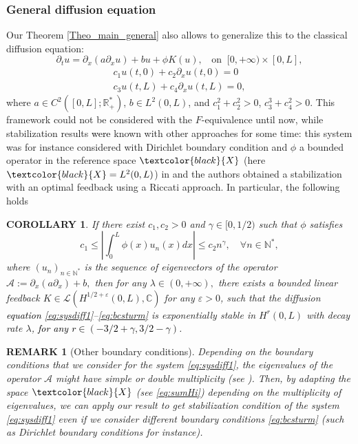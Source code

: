 \documentclass[11pt, dvipsnames]{amsart}
\newtheorem{rmk}[theorem]{REMARK}
\newtheorem{corollary}[theorem]{COROLLARY}
\begin{document}
\subsubsection{General diffusion equation}
Our Theorem \ref{Theo_main_general} also allows to generalize this to the classical diffusion equation:
\begin{equation}
\label{eq:sysdiff1}
    \partial_{t}u=\partial_{x}(a\partial_{x}u) +b u+\phi K(u),\;\;\text{ on }\ [0,+\infty)\times [0,L],
\end{equation}
\begin{equation}
\begin{split}
\label{eq:bcsturm}
    c_{1}u(t,0) + c_{2}\partial_{x}u(t,0)=0\\
    c_{3}u(t,L) + c_{4}\partial_{x}u(t,L)=0,
    \end{split}
\end{equation}
where 
$a\in C^{2}([0,L];\mathbb{R}_{+}^*)$, $b\in L^{2}(0,L)$,
and
 $c_{1}^{2}+c_{2}^{2}>0$, $c_{3}^{3}+c_{4}^{2}>0$.   
This framework could not be considered with the $F$-equivalence until now, while stabilization results \textcolor{black}{were} known with other approaches for some time: this system was for instance considered with Dirichlet boundary condition and $\phi$ a bounded operator in the reference space $\textcolor{black}{X}$ (here $\textcolor{black}{X}=L^{2}(0,L)$) in \cite{banks1984linear} and the authors obtained a stabilization with an optimal feedback using a Riccati approach. 
In particular, the following holds 
\begin{corollary} \label{corollary-diffusion}
    If there exist $c_1, c_2>0$ and $\gamma\in[0,1/2)$ such that $\phi$ satisfies
 \begin{equation}
 \label{eq:cond-cor}
c_1\leq \left|\int_0^L\phi(x)u_n(x)dx\right|\leq c_2 n^{\gamma}, \quad \forall n\in \mathbb{N}^*,
 \end{equation} where $(u_n)_{n\in \mathbb{N}^*}$ is the sequence of eigenvectors of the operator $\mathcal{A}:=\partial_x(a\partial_x)+b,$
then for any $\lambda\in (0,+\infty),$ there exists a bounded linear feedback $K\in \mathcal{L}(H^{1/2+\varepsilon}(0,L),\mathbb{C})$ for any $\varepsilon>0$, such that the diffusion \textcolor{black}{equation} \eqref{eq:sysdiff1}--\eqref{eq:bcsturm} is exponentially stable in $H^r(0,L)$ with decay rate $\lambda$, \textcolor{black}{for any $r\in (-3/2+\gamma,3/2-\gamma)$}.
\end{corollary}
\begin{rmk}[Other boundary conditions]
Depending on the boundary conditions that we consider for the system \eqref{eq:sysdiff1}, the eigenvalues of the operator $\mathcal{A}$ might have simple or double multiplicity (see \cite{Kong1996-eigenvalues,Weidmann2006-spectral,Moller1999-unboundedness, Bailey1996-regular}). Then, by adapting the space $\textcolor{black}{X}$ (see \eqref{eq:sumHi}) depending on the multiplicity of eigenvalues, we can apply our result to get stabilization condition of the system \eqref{eq:sysdiff1} even if we consider different boundary conditions \eqref{eq:bcsturm} (such as Dirichlet boundary conditions for instance).
\end{rmk}
\end{document}
